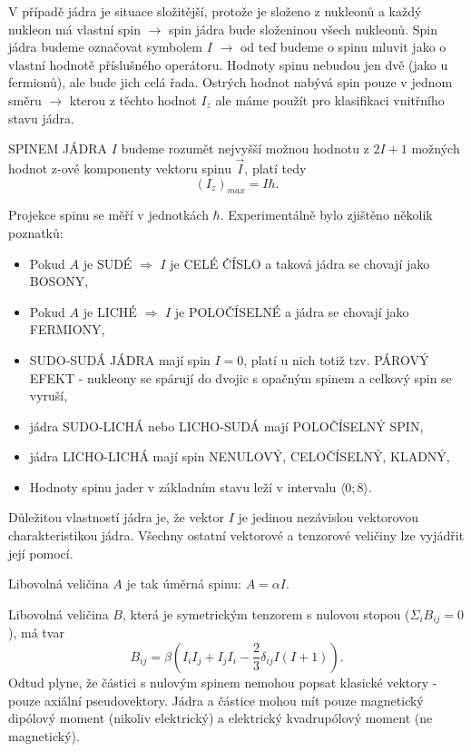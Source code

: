 \documentclass[../../main.tex]{subfiles}
\begin{document}
V případě jádra je situace složitější, protože je složeno z nukleonů a každý nukleon má vlastní spin $\rightarrow$ spin jádra bude složeninou všech nukleonů. Spin jádra budeme označovat symbolem $I$ $\rightarrow$ od teď budeme o spinu mluvit jako o vlastní hodnotě příslušného operátoru. Hodnoty spinu nebudou jen dvě (jako u fermionů), ale bude jich celá řada. Ostrých hodnot nabývá spin pouze v jednom směru $\rightarrow$ kterou z těchto hodnot $I_z$ ale máme použít pro klasifikaci vnitřního stavu jádra.

SPINEM JÁDRA $I$ budeme rozumět nejvyšší možnou hodnotu z $2I + 1$ možných hodnot z-ové komponenty vektoru spinu $\vec{I}$, platí tedy
\begin{equation}
(I_z)_{max} = I \hbar.
\end{equation}

Projekce spinu se měří v jednotkách $\hbar$. Experimentálně bylo zjištěno několik poznatků:
\begin{itemize}
	\item Pokud $A$ je SUDÉ $\Rightarrow$ $I$ je CELÉ ČÍSLO a taková jádra se chovají jako BOSONY, 
	\item Pokud $A$ je LICHÉ $\Rightarrow$ $I$ je POLOČÍSELNÉ a jádra se chovají jako FERMIONY,
	\item SUDO-SUDÁ JÁDRA mají spin $I = 0$, platí u nich totiž tzv. PÁROVÝ EFEKT - nukleony se spárují do dvojic s opačným spinem a celkový spin se vyruší,
	\item jádra SUDO-LICHÁ nebo LICHO-SUDÁ mají POLOČÍSELNÝ SPIN,
	\item jádra LICHO-LICHÁ mají spin NENULOVÝ, CELOČÍSELNÝ, KLADNÝ,
	\item Hodnoty spinu jader v základním stavu leží v intervalu $\langle 0; 8\rangle$.
\end{itemize}

Důležitou vlastností jádra je, že vektor $I$ je jedinou nezávislou vektorovou charakteristikou jádra. Všechny ostatní vektorové a tenzorové veličiny lze vyjádřit její pomocí.

Libovolná veličina $A$ je tak úměrná spinu: $A = \alpha I$.

Libovolná veličina $B$, která je symetrickým tenzorem s nulovou stopou ($\Sigma_{i} B_{ij} = 0$), má tvar
\begin{equation}
B_{ij} = \beta \left( I_i I_j + I_j I_i - \dfrac{2}{3} \delta _{ij} I(I + 1)\right) .
\end{equation}
Odtud plyne, že částici s nulovým spinem nemohou popsat klasické vektory - pouze axiální pseudovektory. Jádra a částice mohou mít pouze magnetický dipólový moment (nikoliv elektrický) a elektrický kvadrupólový moment (ne magnetický).
\end{document}

